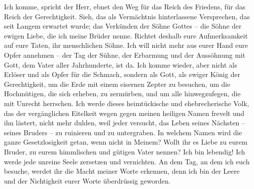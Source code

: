         Ich komme, spricht der Herr, ebnet den Weg für das Reich des Friedens, für das Reich der Gerechtigkeit. Sieh, das als Vermächtnis hinterlassene Versprechen, das seit Langem erwartet wurde; das Verkünden der Söhne Gottes -- die Söhne der ewigen Liebe, die ich meine Brüder nenne. Richtet deshalb eure Aufmerksamkeit auf eure Taten, ihr menschlichen Söhne. Ich will nicht mehr aus eurer Hand eure Opfer annehmen -- der Tag der Sühne, der Erbarmung und der Aussöhnung mit Gott, dem Vater aller Jahrhunderte, ist da. Ich komme wieder, aber nicht als Erlöser und als Opfer für die Schmach, sondern als Gott, als ewiger König der Gerechtigkeit, um die Erde mit einem eisernen Zepter zu besuchen, um die Hochmütigen, die sich erheben, zu zermürben, und um alle hinwegzufegen, die mit Unrecht herrschen. Ich werde dieses heimtückische und ehebrecherische Volk, das der vergänglichen Eitelkeit wegen gegen meinen heiligen Namen frevelt und ihn lästert, nicht mehr dulden, weil jeder versucht, das Leben seines Nächsten -- seines Bruders -- zu ruinieren und zu untergraben. In welchem Namen wird die ganze Gesetzlosigkeit getan, wenn nicht in Meinem? Wollt ihr es Liebe zu eurem Bruder, zu eurem himmlischen und gütigen Vater nennen? Ich bin lebendig! Ich werde jede unreine Seele zersetzen und vernichten. An dem Tag, an dem ich euch besuche, werdet ihr die Macht meiner Worte erkennen, denn ich bin der Leere und der Nichtigkeit eurer Worte überdrüssig geworden. 
        
